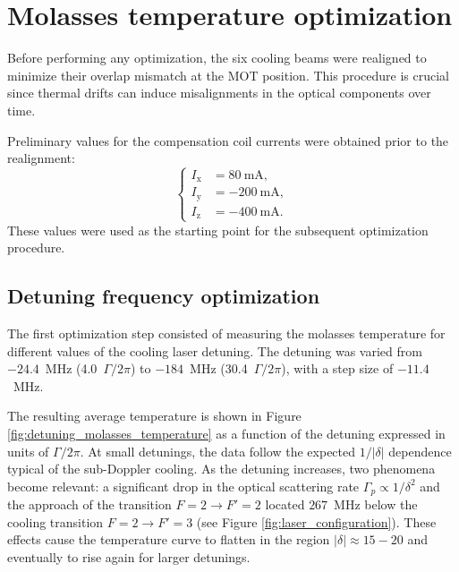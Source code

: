 \section{Molasses temperature optimization}\label{sec:molasses_temperature_optimization}

Before performing any optimization, the six cooling beams were realigned to minimize their overlap mismatch at the MOT position. This procedure is crucial since thermal drifts can induce misalignments in the optical components over time.

Preliminary values for the compensation coil currents were obtained prior to the realignment:
\begin{equation}
    \begin{cases}
        I_{\mathrm{x}} &= 80~\mathrm{mA}, \\
        I_{\mathrm{y}} &= -200~\mathrm{mA}, \\
        I_{\mathrm{z}} &= -400~\mathrm{mA}.
    \end{cases}
    \label{eq:shim_preliminary_values}
\end{equation}
These values were used as the starting point for the subsequent optimization procedure.


\subsection{Detuning frequency optimization}
The first optimization step consisted of measuring the molasses temperature for different values of the cooling laser detuning. The detuning was varied from $-24.4$~MHz (4.0~$\Gamma/2\pi$) to $-184$~MHz (30.4~$\Gamma/2\pi$), with a step size of $-11.4$~MHz.


The resulting average temperature is shown in Figure \ref{fig:detuning_molasses_temperature} as a function of the detuning expressed in units of $\Gamma/2\pi$. At small detunings, the data follow the expected $1/|\delta|$ dependence typical of the sub-Doppler cooling. As the detuning increases, two phenomena become relevant: a significant drop in the optical scattering rate $\Gamma_p \propto 1/\delta^2$ and the approach of the transition $F=2 \rightarrow F'=2$ located $267$~MHz below the cooling transition $F=2 \rightarrow F'=3$ (see Figure \ref{fig:laser_configuration}). These effects cause the temperature curve to flatten in the region $|\delta|\approx15-20$ and eventually to rise again for larger detunings.

